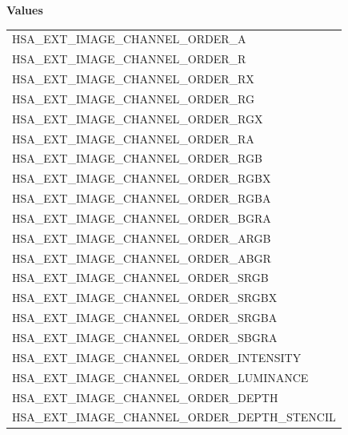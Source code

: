 \documentclass[final]{book}
\newcommand{\reftyp}[1]{#1}
\newcommand{\refenu}[1]{\reftyp{#1}}
\begin{document}
\noindent\textbf{Values}\\[-5mm]
\begin{longtable}{@{\hspace{2em}}p{\linewidth-2em}}
\hspace{-2em}\refenu{HSA_\-EXT_\-IMAGE_\-CHANNEL_\-ORDER_\-A}\\[2mm]
\hspace{-2em}\refenu{HSA_\-EXT_\-IMAGE_\-CHANNEL_\-ORDER_\-R}\\[2mm]
\hspace{-2em}\refenu{HSA_\-EXT_\-IMAGE_\-CHANNEL_\-ORDER_\-RX}\\[2mm]
\hspace{-2em}\refenu{HSA_\-EXT_\-IMAGE_\-CHANNEL_\-ORDER_\-RG}\\[2mm]
\hspace{-2em}\refenu{HSA_\-EXT_\-IMAGE_\-CHANNEL_\-ORDER_\-RGX}\\[2mm]
\hspace{-2em}\refenu{HSA_\-EXT_\-IMAGE_\-CHANNEL_\-ORDER_\-RA}\\[2mm]
\hspace{-2em}\refenu{HSA_\-EXT_\-IMAGE_\-CHANNEL_\-ORDER_\-RGB}\\[2mm]
\hspace{-2em}\refenu{HSA_\-EXT_\-IMAGE_\-CHANNEL_\-ORDER_\-RGBX}\\[2mm]
\hspace{-2em}\refenu{HSA_\-EXT_\-IMAGE_\-CHANNEL_\-ORDER_\-RGBA}\\[2mm]
\hspace{-2em}\refenu{HSA_\-EXT_\-IMAGE_\-CHANNEL_\-ORDER_\-BGRA}\\[2mm]
\hspace{-2em}\refenu{HSA_\-EXT_\-IMAGE_\-CHANNEL_\-ORDER_\-ARGB}\\[2mm]
\hspace{-2em}\refenu{HSA_\-EXT_\-IMAGE_\-CHANNEL_\-ORDER_\-ABGR}\\[2mm]
\hspace{-2em}\refenu{HSA_\-EXT_\-IMAGE_\-CHANNEL_\-ORDER_\-SRGB}\\[2mm]
\hspace{-2em}\refenu{HSA_\-EXT_\-IMAGE_\-CHANNEL_\-ORDER_\-SRGBX}\\[2mm]
\hspace{-2em}\refenu{HSA_\-EXT_\-IMAGE_\-CHANNEL_\-ORDER_\-SRGBA}\\[2mm]
\hspace{-2em}\refenu{HSA_\-EXT_\-IMAGE_\-CHANNEL_\-ORDER_\-SBGRA}\\[2mm]
\hspace{-2em}\refenu{HSA_\-EXT_\-IMAGE_\-CHANNEL_\-ORDER_\-INTENSITY}\\[2mm]
\hspace{-2em}\refenu{HSA_\-EXT_\-IMAGE_\-CHANNEL_\-ORDER_\-LUMINANCE}\\[2mm]
\hspace{-2em}\refenu{HSA_\-EXT_\-IMAGE_\-CHANNEL_\-ORDER_\-DEPTH}\\[2mm]
\hspace{-2em}\refenu{HSA_\-EXT_\-IMAGE_\-CHANNEL_\-ORDER_\-DEPTH_\-STENCIL}
\end{longtable}
\end{document}
